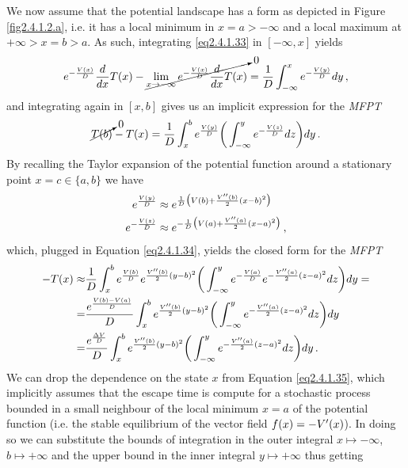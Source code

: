 \documentclass[../main.tex]{subfiles}
\begin{document}
We now assume that the potential landscape has a form as depicted in Figure \ref{fig2.4.1.2.a}, i.e. it has a local minimum in $x=a>-\infty$ and a local maximum at $+\infty>x=b>a$.
As such, integrating \eqref{eq2.4.1.33} in $[-\infty,x]$ yields
\begin{equation*}
         e^{-\frac{V(x)}{D}}\frac{d}{dx}T(x) - \cancelto{0}{\lim_{x\to-\infty}e^{-\frac{V(x)}{D}}\frac{d}{dx}T(x)}= \frac{1}{D}\int_{-\infty}^{x}e^{-\frac{V(y)}{D}}dy\,,
\end{equation*}
and integrating again in $[x,b]$ gives us an implicit expression for the \textit{MFPT}
\begin{equation}\label{eq2.4.1.34}
        \cancelto{0}{T(b)} - T(x) =\frac{1}{D}\int_{x}^{b}e^{\frac{V(y)}{D}}\bigg(\int_{-\infty}^{y}e^{-\frac{V(z)}{D}}dz\bigg)dy\,.
\end{equation}
By recalling the Taylor expansion of the potential function around a stationary point $x=c\in\{a,b\}$ we have
\begin{align*}
     e^{\frac{V(y)}{D}} \approx& \; e^{\frac{1}{D}\big(V(b)+\frac{V''(b)}{2}(x-b)^{2}\big)} \nonumber \\
      e^{-\frac{V(z)}{D}} \approx& \; e^{-\frac{1}{D}\big(V(a)+\frac{V''(a)}{2}(x-a)^{2}\big)} \,, \nonumber
\end{align*}
which, plugged in Equation \eqref{eq2.4.1.34}, yields the closed form for the \textit{MFPT}
\begin{align}
        -T(x) \approx& \frac{1}{D}\int_{x}^{b}e^{\frac{V(b)}{D}}e^{\frac{V''(b)}{2}(y-b)^{2}}\bigg(\int_{-\infty}^{y}e^{-\frac{V(a)}{D}}e^{-\frac{V''(a)}{2}(z-a)^{2}}dz\bigg)dy = \nonumber \\
                   =& \frac{e^{\frac{V(b)-V(a)}{D}}}{D}\int_{x}^{b}e^{\frac{V''(b)}{2}(y-b)^{2}}\bigg(\int_{-\infty}^{y}e^{-\frac{V''(a)}{2}(z-a)^{2}}dz\bigg)dy \nonumber \\
                   =& \frac{e^{\frac{\Delta V}{D}}}{D}\int_{x}^{b}e^{\frac{V''(b)}{2}(y-b)^{2}}\bigg(\int_{-\infty}^{y}e^{-\frac{V''(a)}{2}(z-a)^{2}}dz\bigg)dy\,. \label{eq2.4.1.35}
\end{align}
We can drop the dependence on the state $x$ from Equation \eqref{eq2.4.1.35}, which implicitly assumes that the escape time is compute for a stochastic process bounded in a small neighbour of the local minimum $x=a$ of the potential function (i.e. the stable equilibrium of the vector field $f(x)=-V'(x)$).
In doing so we can substitute the bounds of integration in the outer integral $x\mapsto-\infty$, $b\mapsto+\infty$ and the upper bound in the inner integral $y\mapsto+\infty$ thus getting
\end{document}
